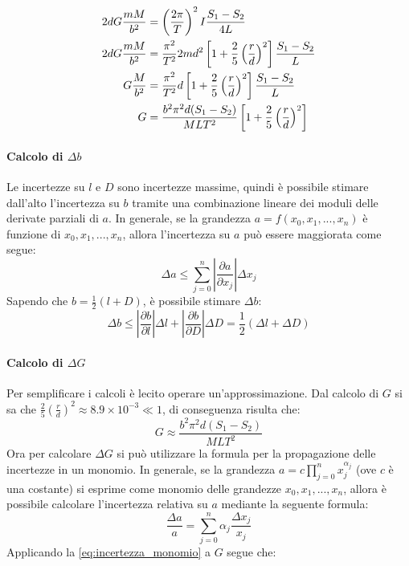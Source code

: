 \documentclass{article}
\newcommand{\abs}[1]{\left| #1 \right|}
\begin{document}
\begin{align}
    2dG\frac{mM}{b^2} &= \left(\frac{2\pi}{T}\right)^2I\frac{S_1-S_2}{4L}\notag\\
    2dG\frac{mM}{b^2} &= \frac{\pi ^2}{T^2} 2md^2\left[1+\frac{2}{5}\left(\frac{r}{d}\right)^2\right] \frac{S_1-S_2}{L}\notag\\
    G\frac{M}{b^2} &= \frac{\pi^2}{T^2}d\left[1+\frac{2}{5}\left(\frac{r}{d}\right)^2\right]\frac{S_1-S_2}{L}\notag\\
    G &= \frac{b^2\pi^2d(S_1-S_2)}{MLT^2}\left[1+\frac{2}{5}\left(\frac{r}{d}\right)^2\right]
\end{align}

\paragraph{Calcolo di $\Delta b$}
Le incertezze su $l$ e $D$ sono incertezze massime, quindi è possibile stimare dall'alto l'incertezza su $b$ tramite una combinazione lineare dei moduli delle derivate parziali di $a$\cite{taylor}. In generale, se la grandezza $a = f(x_0, x_1, ..., x_n)$ è funzione di $x_0, x_1, ..., x_n$, allora l'incertezza su $a$ può essere maggiorata come segue:
\begin{equation}
    \Delta a \leqslant \sum_{j = 0}^n \abs{\frac{\partial a}{\partial x_j}} \Delta x_j
\end{equation}
Sapendo che $\displaystyle b = \frac{1}{2} \left( l + D \right)$, è possibile stimare $\Delta b$:
\begin{equation}
    \Delta b \leqslant \abs{\frac{\partial b}{\partial l}} \Delta l + \abs{\frac{\partial b}{\partial D}} \Delta D = \frac{1}{2} (\Delta l + \Delta D)
\end{equation}

\paragraph{Calcolo di $\Delta G$}
Per semplificare i calcoli è lecito operare un'approssimazione.
Dal calcolo di $G$ si sa che $\displaystyle \frac{2}{5} \left( \frac{r}{d} \right) ^ 2 \approx 8.9 \times 10 ^ {-3} \ll 1$, di conseguenza risulta che:
\begin{equation}
    G \approx \frac{b^2 \pi^2 d \left( S_1 - S_2 \right)}{M L T^2}
\end{equation}
Ora per calcolare $\Delta G$ si può utilizzare la formula per la propagazione delle incertezze in un monomio\cite{taylor}. In generale, se la grandezza $\displaystyle a = c \prod_{j = 0}^n x_j^{\alpha_j}$ (ove $c$ è una costante) si esprime come monomio delle grandezze $x_0, x_1, ..., x_n$, allora è possibile calcolare l'incertezza relativa su $a$ mediante la seguente formula:
\begin{equation}\label{eq:incertezza_monomio}
    \frac{\Delta a}{a} = \sum_{j = 0}^n \alpha_j \frac{\Delta x_j}{x_j}
\end{equation}
Applicando la \eqref{eq:incertezza_monomio} a $G$ segue che:
\end{document}
